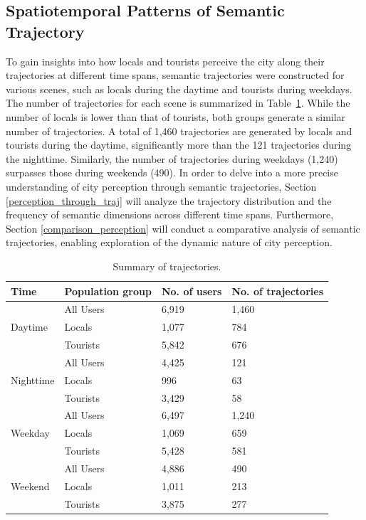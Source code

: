 \documentclass{article}
\theoremstyle{definition}
\theoremstyle{remark}
\begin{document}
\subsection{Spatiotemporal Patterns of Semantic Trajectory}
To gain insights into how locals and tourists perceive the city along their trajectories at different time spans, semantic trajectories were constructed for various scenes, such as locals during the daytime and tourists during weekdays. The number of trajectories for each scene is summarized in Table~\ref{tab:trajectories_summary}. While the number of locals is lower than that of tourists, both groups generate a similar number of trajectories. A total of 1,460 trajectories are generated by locals and tourists during the daytime, significantly more than the 121 trajectories during the nighttime. Similarly, the number of trajectories during weekdays (1,240) surpasses those during weekends (490). In order to delve into a more precise understanding of city perception through semantic trajectories, Section \ref{perception_through_traj} will analyze the trajectory distribution and the frequency of semantic dimensions across different time spans. Furthermore, Section \ref{comparison_perception} will conduct a comparative analysis of semantic trajectories, enabling exploration of the dynamic nature of city perception.

\begin{table}[h!]
\centering
\caption{\label{tab:trajectories_summary}Summary of trajectories.}
\begin{tabular}{llll} \hline
Time & Population group & No. of users & No. of trajectories \\
\hline
\multirow{3}{*}{Daytime} 
& All Users & 6,919 & 1,460 \\
& Locals & 1,077 & 784 \\
& Tourists & 5,842 & 676 \\
\hline
\multirow{3}{*}{Nighttime} 
& All Users & 4,425 & 121 \\
& Locals & 996 & 63 \\
& Tourists & 3,429 & 58 \\
\hline
\multirow{3}{*}{Weekday} 
& All Users & 6,497 & 1,240 \\
& Locals & 1,069 & 659 \\
& Tourists & 5,428 & 581 \\
\hline
\multirow{3}{*}{Weekend} 
& All Users & 4,886 & 490 \\
& Locals & 1,011 & 213 \\
& Tourists & 3,875 & 277 \\
\hline
\end{tabular}
\end{table}
\end{document}
